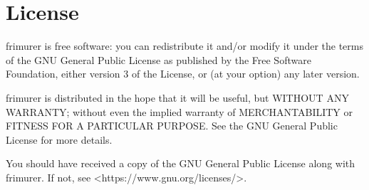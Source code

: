 \documentclass[11pt,parskip=half]{scrartcl}
\begin{document}
\section{License}
\label{sec:license}

frimurer is free software: you can redistribute it and/or modify it
under the terms of the GNU General Public License as published by the
Free Software Foundation, either version 3 of the License, or (at your
option) any later version.

frimurer is distributed in the hope that it will be useful, but
WITHOUT ANY WARRANTY; without even the implied warranty of
MERCHANTABILITY or FITNESS FOR A PARTICULAR PURPOSE. See the GNU
General Public License for more details.

You should have received a copy of the GNU General Public License
along with frimurer. If not, see <https://www.gnu.org/licenses/>.
\end{document}

